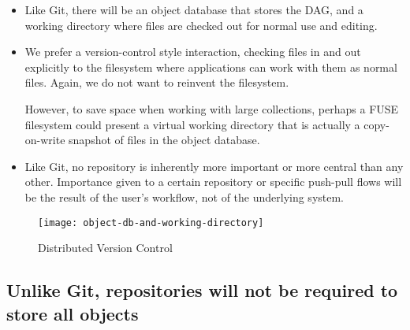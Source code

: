 \documentclass[a4paper]{article}
\begin{document}
\begin{itemize}
\item
  Like Git, there will be an object database that stores the DAG, and a
  working directory where files are checked out for normal use and
  editing.
\item
  We prefer a version-control style interaction, checking files in and
  out explicitly to the filesystem where applications can work with them
  as normal files. Again, we do not want to reinvent the filesystem.

  However, to save space when working with large collections, perhaps a FUSE
  filesystem could present a virtual working directory that is actually a
  copy-on-write snapshot of files in the object database.
\item
  Like Git, no repository is inherently more important or more central than any
  other. Importance given to a certain repository or specific push-pull flows
  will be the result of the user's workflow, not of the underlying system.
\end{itemize}


\begin{figure}[h!]
  \caption{Distributed Version Control}
  \label{fig:object-db-and-working-directory}
  \centering
    \texttt{[image: object-db-and-working-directory]}
\end{figure}



\subsection{Unlike Git, repositories will not be required to store
all
objects}\label{unlike-git-repositories-will-not-be-required-to-store-all-objects}
\end{document}
